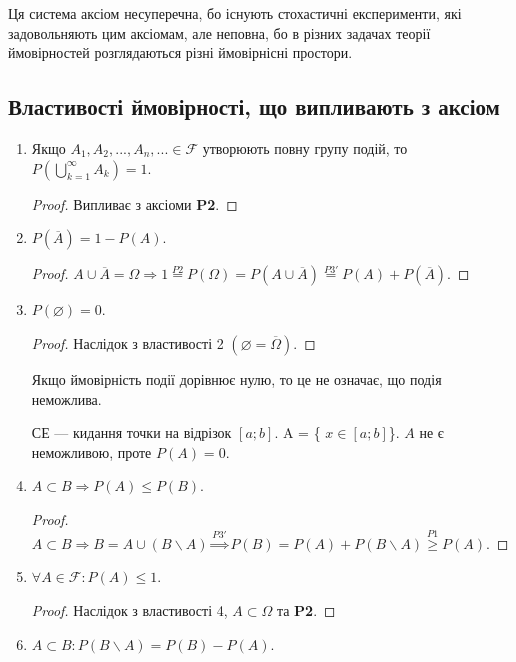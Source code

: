 Ця система аксіом несуперечна, бо існують стохастичні експерименти,
які задовольняють цим аксіомам, але неповна, бо в різних задачах
теорії ймовірностей розглядаються різні ймовірнісні простори.

\subsection{Властивості ймовірності, що випливають з аксіом}
\begin{enumerate}
    \item Якщо $A_1, A_2, ..., A_n, ... \in \mathcal{F}$ утворюють повну групу 
    подій, то $P\left(\bigcup\limits_{k=1}^\infty A_k\right) = 1$.
    \begin{proof}
        Випливає з аксіоми \textbf{P2}.
    \end{proof}
    \item $P(\overline{A}) = 1 - P(A)$.
    \begin{proof}
        $A \cup \overline{A} = \Omega \Rightarrow 1 \overset{P2}{=} P(\Omega) 
        = P(A \cup \overline{A}) \overset{P3'}{=} P(A) + P(\overline{A})$.
    \end{proof}
    \item $P(\varnothing) = 0$.
    \begin{proof}
        Наслідок з властивості 2 $(\varnothing = \overline{\Omega})$.
    \end{proof}
    \begin{remark}
        Якщо ймовірність події дорівнює нулю, то це не означає, що подія неможлива.
    \end{remark}
    \begin{example}
        СЕ --- кидання точки на відрізок $[a; b]$. A = \{ $x \in [a; b]$\}. $A$ не є неможливою, проте $P(A) = 0$.
    \end{example}
    \item $A \subset B \Rightarrow P(A) \leq P(B)$.
    \begin{proof}
        $A \subset B \Rightarrow B = A \cup (B \backslash A) 
        \overset{P3'}{\Rightarrow} P(B) = P(A) + P(B \backslash A) 
        \overset{P1}{\geq} P(A)$.
    \end{proof}
    \item $\forall A \in \mathcal{F}: P(A) \leq 1$.
    \begin{proof}
        Наслідок з властивості 4, $A \subset \Omega$ та \textbf{P2}.
    \end{proof}
    \item $A \subset B: P(B \backslash A) = P(B) - P(A)$.

\end{enumerate}
